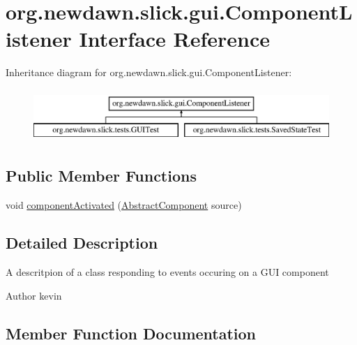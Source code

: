 \hypertarget{interfaceorg_1_1newdawn_1_1slick_1_1gui_1_1_component_listener}{}\section{org.\+newdawn.\+slick.\+gui.\+Component\+Listener Interface Reference}
\label{interfaceorg_1_1newdawn_1_1slick_1_1gui_1_1_component_listener}
Inheritance diagram for org.\+newdawn.\+slick.\+gui.\+Component\+Listener\+:\begin{figure}[H]
\begin{center}
\leavevmode
\includegraphics[height=2.000000cm]{interfaceorg_1_1newdawn_1_1slick_1_1gui_1_1_component_listener}
\end{center}
\end{figure}
\subsection*{Public Member Functions}
\begin{DoxyCompactItemize}
\item 
void \mbox{\hyperlink{interfaceorg_1_1newdawn_1_1slick_1_1gui_1_1_component_listener_a078740e03974ce07a757744a771e8626}{component\+Activated}} (\mbox{\hyperlink{classorg_1_1newdawn_1_1slick_1_1gui_1_1_abstract_component}{Abstract\+Component}} source)
\end{DoxyCompactItemize}


\subsection{Detailed Description}
A descritpion of a class responding to events occuring on a G\+UI component

\begin{DoxyAuthor}{Author}
kevin 
\end{DoxyAuthor}


\subsection{Member Function Documentation}
\mbox{\label{interfaceorg_1_1newdawn_1_1slick_1_1gui_1_1_component_listener_a078740e03974ce07a757744a771e8626}} 
